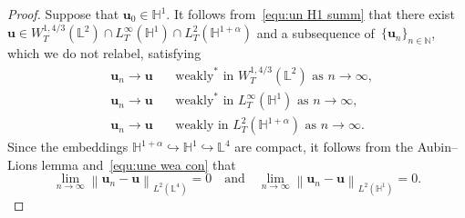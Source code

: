 \documentclass[11pt,reqno]{amsart}
\theoremstyle{definition}
\numberwithin{equation}{section}
\newcommand{\bff}{\boldsymbol}
\newcommand{\bb}{\mathbb}
\newcommand{\norm}[2]{\left\|{#1}\right\|_{#2}}
\begin{document}
\begin{proof}
Suppose that $\bff{u}_0\in\bb{H}^1$. It follows from~\eqref{equ:un H1 summ} that there exist
$\bff{u} \in W^{1, 4/3}_{T}(\bb{L}^2) \cap L^\infty_{T}(\bb{H}^1) \cap L^2_T(\bb{H}^{1+\alpha})$ and a subsequence
of~$\{\bff{u}_n\}_{n\in\bb{N}}$, which we do not relabel, satisfying
\begin{equation}\label{equ:wea con llb}
	\begin{aligned}
		& \bff{u}_n\to\bff{u}
		&&\,\text{weakly}^\ast \text{ in $W^{1, 4/3}_{T}(\bb{L}^2)$ as $n\to \infty$},
		\\
		& \bff{u}_n\to\bff{u}
		&&\,\text{weakly}^\ast \text{ in $L^\infty_{T}(\bb{H}^1)$ as $n\to \infty$},
		\\
		& \bff{u}_n\to \bff{u}
		&&\,\text{weakly} \text{ in $L^2_{T}(\bb{H}^{1+\alpha})$ as $n\to \infty$.}
	\end{aligned}
\end{equation}
Since the embeddings $\bb{H}^{1+\alpha}\hookrightarrow \bb{H}^1 \hookrightarrow \bb{L}^4$ are compact, it follows from the
Aubin--Lions lemma and~\eqref{equ:une wea con} that
\begin{equation}\label{equ:L2 L4 llb}
	\lim_{n\to\infty} \norm{\bff{u}_n-\bff{u}}{L^2(\bb{L}^4)} 
	= 0
	\quad\text{and}\quad 
	\lim_{n\to\infty} \norm{\bff{u}_n-\bff{u}}{L^2(\bb{H}^1)} 
	= 0.
\end{equation}


\end{proof}
\end{document}
